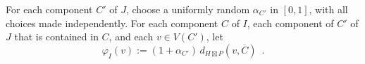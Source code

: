 \documentclass{patmorin}
\renewcommand{\ge}{\geqslant}
\begin{document}
%
%
%


For each component $C'$ of $J$, choose a uniformly random $\alpha_{C'}$ in $[0,1]$, with all choices made independently.
For each component $C$ of $I$, each component of $C'$ of $J$ that is contained in $C$, and each $v \in V(C')$, let
\[
  \varphi_{I}(v):=(1+\alpha_{C'})\,d_{H\boxtimes P}(v,\overline{C}) \enspace .
\]
\end{document}
